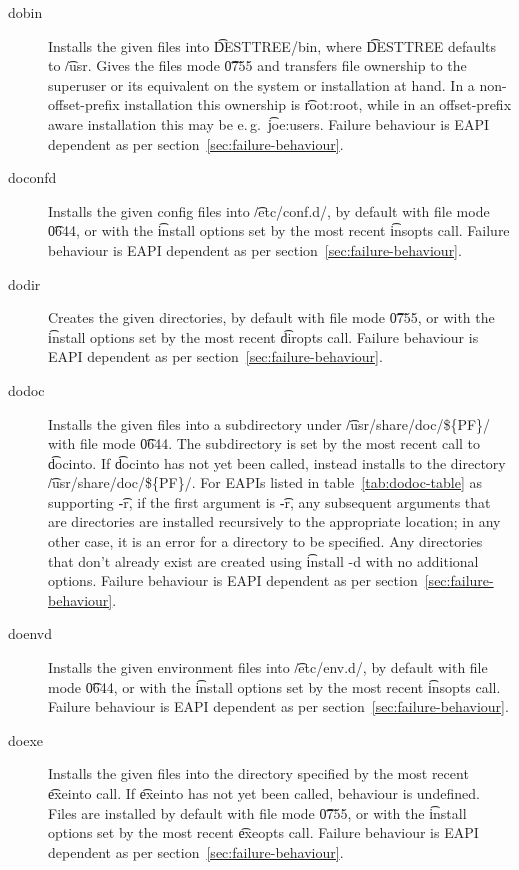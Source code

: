 \begin{description}
\item[dobin] Installs the given files into \t{DESTTREE/bin}, where \t{DESTTREE} defaults to
    \t{/usr}. Gives the files mode \t{0755} and transfers file ownership to the superuser or its
    equivalent on the system or installation at hand. In a non-offset-prefix installation this
    ownership is \t{root:root}, while in an offset-prefix aware installation this may be e.\,g.\
    \t{joe:users}. Failure behaviour is EAPI dependent as per section~\ref{sec:failure-behaviour}.

\item[doconfd] Installs the given config files into \t{/etc/conf.d/}, by default with file mode
    \t{0644}, or with the \t{install} options set by the most recent \t{insopts} call.
    Failure behaviour is EAPI dependent as per section~\ref{sec:failure-behaviour}.

\item[dodir] Creates the given directories, by default with file mode \t{0755}, or with the
    \t{install} options set by the most recent \t{diropts} call. Failure behaviour is EAPI
    dependent as per section~\ref{sec:failure-behaviour}.

\item[dodoc]  Installs the given files into a subdirectory under
    \t{/usr/share/doc/\$\{PF\}/} with file mode \t{0644}. The subdirectory is set by the most
    recent call to \t{docinto}. If \t{docinto} has not yet been called, instead installs to the
    directory \t{/usr/share/doc/\$\{PF\}/}. For EAPIs listed in table~\ref{tab:dodoc-table}
    as supporting \t{-r}, if the first argument is \t{-r}, any subsequent arguments that are
    directories are installed recursively to the appropriate location; in any other case, it is
    an error for a directory to be specified. Any directories that don't already exist are created
    using \t{install -d} with no additional options. Failure behaviour is EAPI dependent as per
    section~\ref{sec:failure-behaviour}.

\item[doenvd] Installs the given environment files into \t{/etc/env.d/}, by default with file mode
    \t{0644}, or with the \t{install} options set by the most recent \t{insopts} call.
    Failure behaviour is EAPI dependent as per section~\ref{sec:failure-behaviour}.

\item[doexe] Installs the given files into the directory specified by the most recent \t{exeinto}
    call. If \t{exeinto} has not yet been called, behaviour is undefined. Files are installed by
    default with file mode \t{0755}, or with the \t{install} options set by the most recent
    \t{exeopts} call.
    Failure behaviour is EAPI dependent as per section~\ref{sec:failure-behaviour}.


\end{description}

